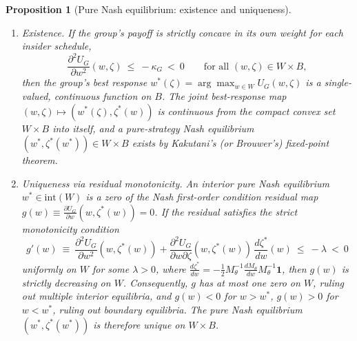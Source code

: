 \documentclass[12pt]{article}
\newtheorem{proposition}[theorem]{Proposition}
\theoremstyle{definition}
\theoremstyle{remark}
\begin{document}
\begin{proposition}[Pure Nash equilibrium: existence and uniqueness]\label{prop:nashqc}
\begin{enumerate}[label=(\roman*),itemsep=1pt]
\item \emph{Existence.} If the group's payoff is strictly concave in its own weight for each insider schedule,
\[
\frac{\partial^2 U_G}{\partial w^2}(w,\zeta)\ \le\ -\kappa_G\ <\ 0\qquad\text{for all }(w,\zeta)\in W\times B,
\]
then the group's best response $w^*(\zeta)=\arg\max_{w\in W}U_G(w,\zeta)$ is a single-valued, continuous function on $B$. The joint best-response map $(w,\zeta)\mapsto(w^*(\zeta),\zeta^*(w))$ is continuous from the compact convex set $W\times B$ into itself, and a pure-strategy Nash equilibrium $(w^*,\zeta^*(w^*))\in W\times B$ exists by Kakutani's (or Brouwer's) fixed-point theorem.
\item \emph{Uniqueness via residual monotonicity.} An interior pure Nash equilibrium $w^*\in\mathrm{int}(W)$ is a zero of the Nash first-order condition residual map $g(w)\equiv\frac{\partial U_G}{\partial w}(w,\zeta^*(w))=0$. If the residual satisfies the strict monotonicity condition
\[
g'(w)\ \equiv\ \frac{\partial^2 U_G}{\partial w^2}(w,\zeta^*(w)) + \frac{\partial^2 U_G}{\partial w\partial\zeta}(w,\zeta^*(w))\,\frac{d\zeta^*}{dw}(w)\ \le\ -\lambda\ <\ 0
\]
uniformly on $W$ for some $\lambda>0$, where $\frac{d\zeta^*}{dw}=-\frac12 M_\theta^{-1}\frac{dM_\theta}{dw}M_\theta^{-1}\mathbf 1$, then $g(w)$ is strictly decreasing on $W$. Consequently, $g$ has at most one zero on $W$, ruling out multiple interior equilibria, and $g(w)<0$ for $w>w^*$, $g(w)>0$ for $w<w^*$, ruling out boundary equilibria. The pure Nash equilibrium $(w^*,\zeta^*(w^*))$ is therefore unique on $W\times B$.
\end{enumerate}
\end{proposition}
\end{document}
